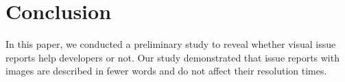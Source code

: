 \section{Conclusion}
\label{sec:conclusion}

In this paper, we conducted a preliminary study to reveal  
whether visual issue reports help developers or not. 
Our study demonstrated that issue reports with images are described in fewer words and do not affect their resolution times. 




